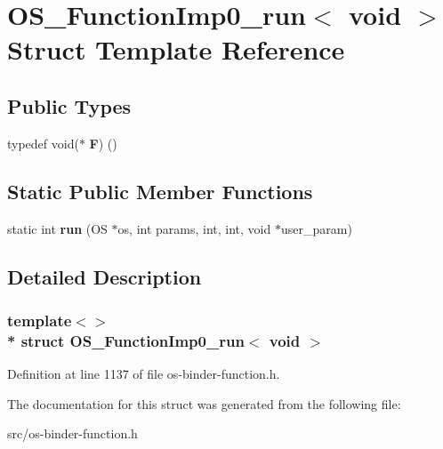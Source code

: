 \hypertarget{struct_o_s___function_imp0__run_3_01void_01_4}{}\section{O\+S\+\_\+\+Function\+Imp0\+\_\+run$<$ void $>$ Struct Template Reference}
\label{struct_o_s___function_imp0__run_3_01void_01_4}
\subsection*{Public Types}
\begin{DoxyCompactItemize}
\item 
typedef void($\ast$ {\bfseries F}) ()\hypertarget{struct_o_s___function_imp0__run_3_01void_01_4_a744a9eac64ece66f9c5efcb27cee5f80}{}\label{struct_o_s___function_imp0__run_3_01void_01_4_a744a9eac64ece66f9c5efcb27cee5f80}

\end{DoxyCompactItemize}
\subsection*{Static Public Member Functions}
\begin{DoxyCompactItemize}
\item 
static int {\bfseries run} (OS $\ast$os, int params, int, int, void $\ast$user\+\_\+param)\hypertarget{struct_o_s___function_imp0__run_3_01void_01_4_aebd1e6101bacf3472067c71df403d88d}{}\label{struct_o_s___function_imp0__run_3_01void_01_4_aebd1e6101bacf3472067c71df403d88d}

\end{DoxyCompactItemize}


\subsection{Detailed Description}
\subsubsection*{template$<$$>$\\*
struct O\+S\+\_\+\+Function\+Imp0\+\_\+run$<$ void $>$}



Definition at line 1137 of file os-\/binder-\/function.\+h.



The documentation for this struct was generated from the following file\+:\begin{DoxyCompactItemize}
\item 
src/os-\/binder-\/function.\+h\end{DoxyCompactItemize}
